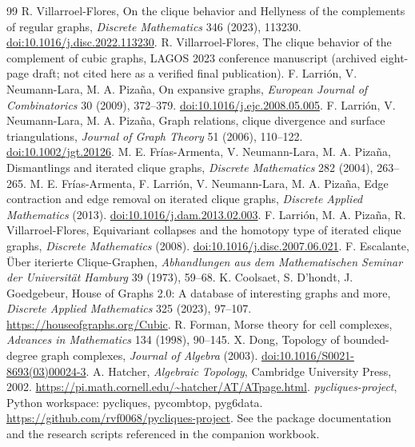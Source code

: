 \documentclass[11pt,a4paper]{article}
\theoremstyle{definition}\newtheorem{definition}[theorem]{Definition}\newtheorem{example}[theorem]{Example}
\theoremstyle{remark}\newtheorem{remark}[theorem]{Remark}
\begin{document}
\begin{thebibliography}{99}
 R. Villarroel-Flores, On the clique behavior and Hellyness of the complements of regular graphs, \emph{Discrete Mathematics} 346 (2023), 113230. \href{https://doi.org/10.1016/j.disc.2022.113230}{doi:10.1016/j.disc.2022.113230}.
 R. Villarroel-Flores, The clique behavior of the complement of cubic graphs, LAGOS 2023 conference manuscript (archived eight-page draft; not cited here as a verified final publication).
 F. Larrión, V. Neumann-Lara, M. A. Pizaña, On expansive graphs, \emph{European Journal of Combinatorics} 30 (2009), 372--379. \href{https://doi.org/10.1016/j.ejc.2008.05.005}{doi:10.1016/j.ejc.2008.05.005}.
 F. Larrión, V. Neumann-Lara, M. A. Pizaña, Graph relations, clique divergence and surface triangulations, \emph{Journal of Graph Theory} 51 (2006), 110--122. \href{https://doi.org/10.1002/jgt.20126}{doi:10.1002/jgt.20126}.
 M. E. Frías-Armenta, V. Neumann-Lara, M. A. Pizaña, Dismantlings and iterated clique graphs, \emph{Discrete Mathematics} 282 (2004), 263--265.
 M. E. Frías-Armenta, F. Larrión, V. Neumann-Lara, M. A. Pizaña, Edge contraction and edge removal on iterated clique graphs, \emph{Discrete Applied Mathematics} (2013). \href{https://doi.org/10.1016/j.dam.2013.02.003}{doi:10.1016/j.dam.2013.02.003}.
 F. Larrión, M. A. Pizaña, R. Villarroel-Flores, Equivariant collapses and the homotopy type of iterated clique graphs, \emph{Discrete Mathematics} (2008). \href{https://doi.org/10.1016/j.disc.2007.06.021}{doi:10.1016/j.disc.2007.06.021}.
 F. Escalante, Über iterierte Clique-Graphen, \emph{Abhandlungen aus dem Mathematischen Seminar der Universität Hamburg} 39 (1973), 59--68.
 K. Coolsaet, S. D'hondt, J. Goedgebeur, House of Graphs 2.0: A database of interesting graphs and more, \emph{Discrete Applied Mathematics} 325 (2023), 97--107. \url{https://houseofgraphs.org/Cubic}.
 R. Forman, Morse theory for cell complexes, \emph{Advances in Mathematics} 134 (1998), 90--145.
 X. Dong, Topology of bounded-degree graph complexes, \emph{Journal of Algebra} (2003). \href{https://doi.org/10.1016/S0021-8693(03)00024-3}{doi:10.1016/S0021-8693(03)00024-3}.
 A. Hatcher, \emph{Algebraic Topology}, Cambridge University Press, 2002. \url{https://pi.math.cornell.edu/~hatcher/AT/ATpage.html}.
 \emph{pycliques-project}, Python workspace: pycliques, pycombtop, pyg6data. \url{https://github.com/rvf0068/pycliques-project}. See the package documentation and the research scripts referenced in the companion workbook.
\end{thebibliography}
\end{document}
